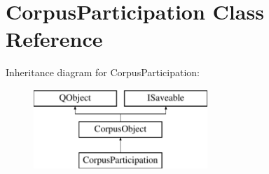 \hypertarget{class_corpus_participation}{}\section{Corpus\+Participation Class Reference}
\label{class_corpus_participation}
Inheritance diagram for Corpus\+Participation\+:\begin{figure}[H]
\begin{center}
\leavevmode
\includegraphics[height=3.000000cm]{class_corpus_participation}
\end{center}
\end{figure}

